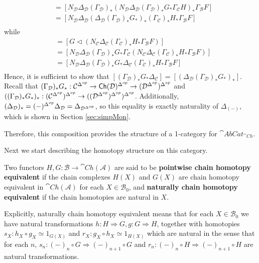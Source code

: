 \begin{enumerate}
\begin{align*}
        &= [N_\mathcal{D}\Delta_\mathcal{D}(\Gamma_\mathcal{D})_*(N_\mathcal{D}\Delta_\mathcal{D}(\Gamma_\mathcal{D})_*G_*\Gamma_\mathcal{C}H)_*\Gamma_\mathcal{B}F] \\
        &= [N_\mathcal{D}\Delta_\mathcal{D}(\Delta_\mathcal{D}(\Gamma_\mathcal{D})_*G_*)_*(\Gamma_\mathcal{C})_*H_*\Gamma_\mathcal{B}F] \\
    \end{align*}
    while
    \begin{align*}
        [G\lhd(H\lhd F)] &= [G\lhd(N_\mathcal{C}\Delta_\mathcal{C}(\Gamma_\mathcal{C})_*H_*\Gamma_\mathcal{B}F)] \\
        &= [N_\mathcal{D}\Delta_\mathcal{D}(\Gamma_\mathcal{D})_*G_*\Gamma_\mathcal{C}(N_\mathcal{C}\Delta_\mathcal{C}(\Gamma_\mathcal{C})_*H_*\Gamma_\mathcal{B}F)] \\
        &= [N_\mathcal{D}\Delta_\mathcal{D}(\Gamma_\mathcal{D})_*G_*\Delta_\mathcal{C}(\Gamma_\mathcal{C})_*H_*\Gamma_\mathcal{B}F] \\
    \end{align*}
    Hence, it is sufficient to show that $[(\Gamma_\mathcal{D})_*G_*\Delta_\mathcal{C}] = [(\Delta_\mathcal{D}(\Gamma_\mathcal{D})_*G_*)_*]$. Recall that $(\Gamma_\mathcal{D})_*G_* : \mathcal{C}^{\Delta^{op}} \rightarrow \textup{\textsf{Ch}}(\mathcal{D})^{\Delta^{op}}\rightarrow (\mathcal{D}^{\Delta^{op}})^{\Delta^{op}}$ and $((\Gamma_\mathcal{D})_*G_*)_* : (\mathcal{C}^{\Delta^{op}})^{\Delta^{op}}\rightarrow ((\mathcal{D}^{\Delta^{op}})^{\Delta^{op}})^{\Delta^{op}}$. Additionally, $(\Delta_\mathcal{D})_* = (-)^{\Delta^{op}}\Delta_\mathcal{D} = \Delta_{\mathcal{D}^{\Delta^{op}}}$, so this equality is exactly naturality of $\Delta_{(-)}$, which is shown in Section \ref{sec:simpMon}.
\end{enumerate}
Therefore, this composition provides the structure of a 1-category for $\cat{AbCat}_{\cat{Ch}}$.



Next we start describing the homotopy structure on this category. 
\begin{defn}[label=defn:ChEquiv]{}
    Two functors $H,G:\mathcal{B}\rightarrow \cat{Ch}(\mathcal{A})$ are said to be \textbf{pointwise chain homotopy equivalent} if the chain complexes $H(X)$ and $G(X)$ are chain homotopy equivalent in $\cat{Ch}(\mathcal{A})$ for each $X \in \mathcal{B}_0$, and \textbf{naturally chain homotopy equivalent} if the chain homotopies are natural in $X$.

    Explicitly, naturally chain homotopy equivalent means that for each $X \in \mathcal{B}_0$ we have natural transformations $h:H\Rightarrow G, g:G\Rightarrow H$, together with homotopies $s_X:h_X\circ g_X\simeq 1_{G(X)}$ and $r_X:g_X\circ h_X\simeq 1_{H(X)}$ which are natural in the sense that for each $n$, $s_n:(-)_n\circ G\Rightarrow (-)_{n+1}\circ G$ and $r_n:(-)_n\circ H\Rightarrow (-)_{n+1}\circ H$ are natural transformations.
\end{defn}

